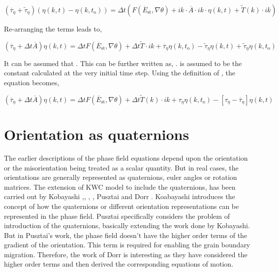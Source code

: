 \documentclass[a4paper,11pt,dvipsnames]{article}
\begin{document}
\begin{equation}
	( \overline{\tau}_{\eta} + \tilde{\tau}_{\eta} ) \left ( \eta(k,t) - \eta(k,t_{\text{o}}) \right ) = \Delta t \left ( F(\overline{E}_{\text{st}} , \nabla \theta ) 
	+ ik \cdot \overline{A} \cdot ik \cdot \eta (k,t) + \tilde{T}(k) \cdot ik \right ) \label{eq:30}
\end{equation}

Re-arranging the terms leads to, 

\begin{equation}
	\left ( \overline{\tau}_\eta + \Delta t \overline{A} \right ) \eta (k,t) = \Delta t F(\overline{E}_{\text{st}} , \nabla \theta ) + \Delta t \tilde{T} \cdot ik + \overline{\tau}_\eta \eta(k,t_{\text{o}}) - \tilde{\tau}_\eta \eta(k,t) + \tilde{\tau}_\eta \eta(k,t_{\text{o}}) \label{eq:31}
\end{equation}

It can be assumed that . This can be further written as, .  is assumed to be the constant  calculated at the very initial time step. Using the definition of \mathsym{\tau_\eta = \overline{\tau}_\eta + \tilde{\tau}_\eta}, the equation becomes, 

\begin{equation}
	\left ( \overline{\tau}_\eta + \Delta t \overline{A} \right ) \eta (k,t) = \Delta t F(\overline{E}_{\text{st}} , \nabla \theta ) + \Delta t \tilde{T}(k) \cdot ik + \tau_\eta \eta(k,t_{\text{o}}) - \left [ \tau_\eta - \overline{\tau}_\eta \right ] \eta (k,t) \label{eq:32}
\end{equation}

\section{Orientation as quaternions}
The earlier descriptions of the phase field equations depend upon the orientation or the misorientation being treated as a scalar quantity. But in real cases, the orientations are generally represented as quaternions, euler angles or rotation matrices. The extension of KWC model to include the quaternions, has been carried out by Kobayashi \cite{Kobayashi1998},\cite{Kobayashi2000}, \cite{Warren2003}, \cite{Kobayashi2005}, Pusztai \cite{Pusztai2005} and Dorr \cite{Dorr2010}. Koabayashi introduces the concept of how the quaternions or different orientation representations can be represented in the phase field. Pusztai specifically considers the problem of introduction of the quaternions, basically extending the work done by Kobayashi. But in Pusztai's work, the phase field doesn't have the higher order terms of the gradient of the orientation. This term is required for enabling the grain boundary migration. Therefore, the work of Dorr is interesting as they have considered the higher order terms and then derived the corresponding equations of motion. 
\end{document}
